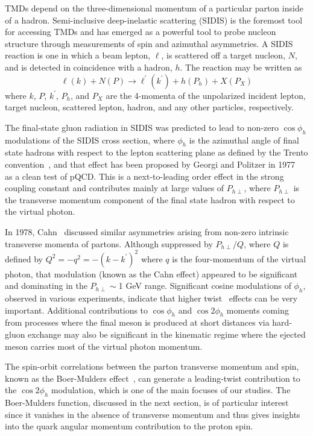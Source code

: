 \documentclass[aps,prl,twocolumn,showpacs,superscriptaddress,groupedaddress]{revtex4-1}  %
\newcommand{\Phperp}{P_{h\perp}}
\begin{document}
TMDs depend on the three-dimensional momentum of a particular parton inside of a hadron.
Semi-inclusive deep-inelastic scattering (SIDIS) is the foremost tool for accessing TMDs and has emerged as a powerful tool to probe nucleon structure through measurements of spin and azimuthal asymmetries.
A SIDIS reaction is one in which a beam lepton, $\ell$, is scattered off a target nucleon, $N$, and is detected in coincidence with a hadron, $h$.
The reaction may be written as
\begin{equation}
\label{eq:sidis}
\ell (k) + N(P) \rightarrow \ell^{\prime} (k^{\prime} ) + h(P_{h}) + X(P_{X})
\end{equation}
where $k$, $P$, $k^{\prime}$, $P_{h}$, and $P_{X}$ are the 4-momenta of the unpolarized incident lepton, target nucleon, scattered lepton, hadron, and any other particles, respectively.

The final-state gluon radiation in SIDIS was predicted to lead to non-zero $\cos\phi_h$ modulations of the SIDIS cross section,
where $\phi_h$ is the azimuthal angle of final state hadrons with respect to the lepton scattering plane as defined by the Trento convention~\cite{Bacchetta:2004jz},
and that effect has been  proposed by Georgi and Politzer in  1977~\cite{Georgi:1977tv}  as a clean test of pQCD.
This is a next-to-leading order effect in the strong coupling constant and contributes mainly at large values of $\Phperp$, where $\Phperp$ is the transverse momentum component of the final state hadron with respect to the virtual photon.

In 1978, Cahn~\cite{Cahn:1978se}   discussed  similar asymmetries arising from non-zero intrinsic transverse momenta of partons.
Although suppressed by $P_{h\perp}/Q$, where $Q$ is defined by $Q^2 = -q^2 = -(k-k^\prime)^2$ where $q$ is the four-momentum of the virtual photon, that modulation (known as the Cahn effect) appeared to be significant and dominating in the $P_{h\perp} \sim $1 GeV range.
Significant cosine modulations of $\phi_h$, observed in various experiments, indicate that higher twist~\cite{Jaffe:1996zw} effects can be very important.
Additional contributions to $\cos \phi_h$ and $\cos 2\phi_h$ moments coming from processes where the final meson
is produced at short distances via hard-gluon exchange \cite{Berger:1979xz} may also be 
significant in the kinematic regime where the ejected meson carries  most of 
the virtual photon momentum.

The spin-orbit correlations between the parton transverse momentum and spin, known as the Boer-Mulders effect~\cite{Boer:1997nt}, can generate a leading-twist
contribution to the $\cos 2\phi_h$ modulation, which is one of the main focuses of our studies.
The Boer-Mulders function, discussed in the next section, is of particular interest since it vanishes in the absence of transverse momentum and thus gives insights into the quark angular momentum contribution to the proton spin.
\end{document}
